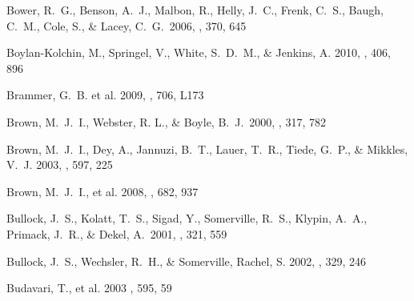\documentclass[]{emulateapj}
\begin{document}
\begin{thebibliography}{999}
Bower, R.~G., Benson,
A.~J., Malbon, R., Helly, J.~C., Frenk, C.~S., Baugh, C.~M., Cole, S., \&
Lacey, C.~G.\ 2006, \mnras, 370, 645

Boylan-Kolchin, M., Springel, V., White, S.\ D.\ M., \& Jenkins, A. 2010, 
\mnras, 406, 896 %

Brammer, G.\ B. et al. 2009, \apj, 706, L173
    
Brown, M.\ J.\ I., Webster, R. L., \& Boyle, B.\ J.\ 2000, \mnras, 317, 782

Brown, M.\ J.\ I., Dey, A., Jannuzi, B.\ T., Lauer, T.\ R., Tiede, G.\ P.,
\& Mikkles, V.\ J. 2003,
\apj, 597, 225



Brown, M.\ J.\ I., et al. 2008,%
\apj, 682, 937

Bullock, J.\ S., Kolatt, T.\ S., Sigad, Y., Somerville, R.\ S., Klypin, A.\ A.,
Primack, J.\ R., \& Dekel, A.\ 2001, \mnras, 321, 559

Bullock, J.\ S., Wechsler, R.\ H., \& Somerville, Rachel, S. 2002, \mnras,
329, 246

Budavari, T., et al. 2003 \apj, 595, 59


\end{thebibliography}
\end{document}

